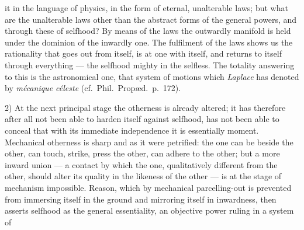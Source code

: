\documentclass[12pt,a4paper]{book}
\begin{document}
it in the language of
physics, in the form of eternal, unalterable laws; but what are the unalterable
laws other than the abstract forms of the general powers, and through these of
selfhood? By means of the laws the outwardly manifold is held under the
dominion of the inwardly one. The fulfilment of the laws shows us the
rationality that goes out from itself, is at one with itself, and returns to
itself through everything --- the selfhood mighty in the selfless. The totality
answering to this is the astronomical one, that system of motions which
\textit{Laplace} has denoted by \textit{mécanique céleste} (cf.\ Phil.\
Propæd.\ p.~172).

2) At the next principal stage the otherness is already altered; it has
therefore after all not been able to harden itself against selfhood, has not
been able to conceal that with its immediate independence it is essentially
moment. Mechanical otherness is sharp and as it were petrified: the one can be
beside the other, can touch, strike, press the other, can adhere to the other;
but a more inward union --- a contact by which the one, qualitatively different
from the other, should alter its quality in the likeness of the other --- is at
the stage of mechanism impossible. Reason, which by mechanical parcelling-out
is prevented from immersing itself in the ground and mirroring itself in
inwardness, then asserts selfhood as the general essentiality, an objective
power ruling in a system of
\end{document}
